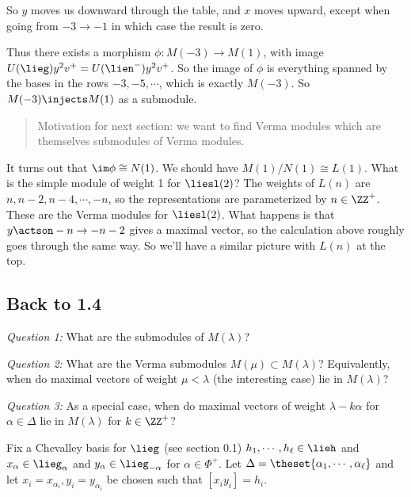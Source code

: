 So \(y\) moves us downward through the table, and \(x\) moves upward,
except when going from \(-3\to -1\) in which case the result is zero.

Thus there exists a morphism \(\phi: M(-3) \to M(1)\), with image
\(U(\lieg) y^2 v^+ = U(\lien^-) y^2 v^+\). So the image of \(\phi\) is
everything spanned by the bases in the rows \(-3, -5, \cdots\), which is
exactly \(M(-3)\). So \(M(-3) \injects M(1)\) as a submodule.

\begin{quote}
Motivation for next section: we want to find Verma modules which are
themselves submodules of Verma modules.
\end{quote}

It turns out that \(\im \phi \cong N(1)\). We should have
\(M(1) / N(1) \cong L(1)\). What is the simple module of weight 1 for
\(\liesl(2)\)? The weights of \(L(n)\) are \(n, n-2, n-4, \cdots, -n\),
so the representations are parameterized by \(n\in \ZZ^{+}\). These are
the Verma modules for \(\liesl(2)\). What happens is that
\(y\actson -n \to -n-2\) gives a maximal vector, so the calculation
above roughly goes through the same way. So we'll have a similar picture
with \(L(n)\) at the top.

\hypertarget{back-to-1.4}{%
\subsection{Back to 1.4}\label{back-to-1.4}}

\emph{Question 1:} What are the submodules of \(M(\lambda)\)?

\emph{Question 2:} What are the Verma submodules
\(M(\mu) \subset M(\lambda)\)? Equivalently, when do maximal vectors of
weight \(\mu < \lambda\) (the interesting case) lie in \(M(\lambda)\)?

\emph{Question 3:} As a special case, when do maximal vectors of weight
\(\lambda - k\alpha\) for \(\alpha \in \Delta\) lie in \(M(\lambda)\)
for \(k\in \ZZ^+\)?

Fix a Chevalley basis for \(\lieg\) (see section 0.1)
\(h_1, \cdots, h_\ell \in \lieh\) and \(x_\alpha \in \lieg_\alpha\) and
\(y_\alpha \in \lieg_{-\alpha}\) for \(\alpha \in \Phi^+\). Let
\(\Delta = \theset{\alpha_1, \cdots, \alpha_\ell}\) and let
\(x_i = x_{\alpha_i}, y_i = y_{\alpha_i}\) be chosen such that
\([x_i y_i] = h_i\).

